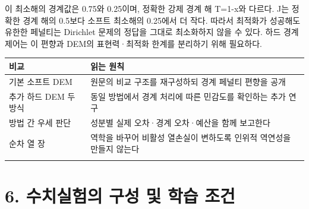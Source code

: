 \documentclass[10pt,a4paper]{article}
\begin{document}
이 최소해의 경계값은 0.75와 0.25이며, 정확한 강제 경계 해 T=1-x와 다르다. J는 정확한 경계 해의 0.5보다 소프트 최소해의 0.25에서 더 작다. 따라서 최적화가 성공해도 유한한 페널티는 Dirichlet 문제의 정답을 그대로 최소화하지 않을 수 있다. 하드 경계 제어는 이 편향과 DEM의 표현력·최적화 한계를 분리하기 위해 필요하다.\par

\begingroup\small

\par\begin{minipage}{\linewidth}\begin{tabular}{>{\raggedright\arraybackslash}p{}>{\raggedright\arraybackslash}p{}}

\rowcolor{tint} \textbf{비교} & \textbf{읽는 원칙}\\\midrule

기본 소프트 DEM & 원문의 비교 구조를 재구성하되 경계 페널티 편향을 공개\\\addlinespace[2pt]

추가 하드 DEM 두 방식 & 동일 방법에서 경계 처리에 따른 민감도를 확인하는 추가 연구\\\addlinespace[2pt]

방법 간 우세 판단 & 성분별 실제 오차·경계 오차·예산을 함께 보고한다\\\addlinespace[2pt]

순차 열 장 & 역학을 바꾸어 비활성 열손실이 변하도록 인위적 역연성을 만들지 않는다\\\addlinespace[2pt]

\bottomrule\end{tabular}\end{minipage}\par\vspace{5pt}\endgroup

\clearpage

\section{6. 수치실험의 구성 및 학습 조건}

\begingroup\small
\end{document}
